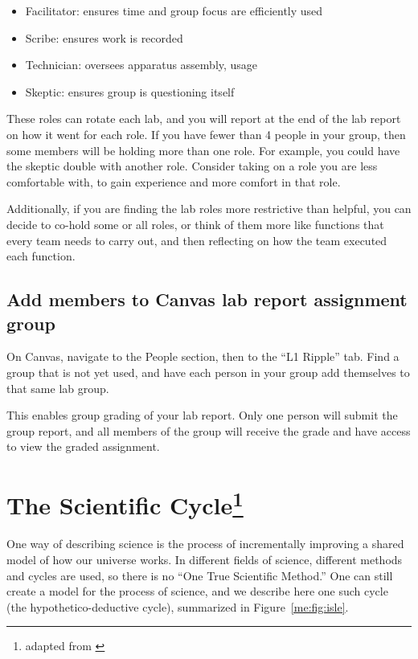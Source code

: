 \begin{itemize}
	\item Facilitator: ensures time and group focus are efficiently used
	\item Scribe: ensures work is recorded
	\item Technician: oversees apparatus assembly, usage
	\item Skeptic: ensures group is questioning itself
\end{itemize}

These roles can rotate each lab, and you will report at the end of the lab report on how it went for each role. If you have fewer than 4 people in your group, then some members will be holding more than one role. For example, you could have the skeptic double with another role. Consider taking on a role you are less comfortable with, to gain experience and more comfort in that role.

Additionally, if you are finding the lab roles more restrictive than helpful, you can decide to co-hold some or all roles, or think of them more like functions that every team needs to carry out, and then reflecting on how the team executed each function.

\subsection{Add members to Canvas lab report assignment group}

\begin{steps}
	\item On Canvas, navigate to the People section, then to the ``L1 Ripple'' tab. Find a group that is not yet used, and have each person in your group add themselves to that same lab group.
\end{steps}

This enables group grading of your lab report. Only one person will submit the group report, and all members of the group will receive the grade and have access to view the graded assignment.

\section{The Scientific Cycle\protect\footnote{adapted from \cite{etkina_college_2014}}}

One way of describing science is the process of incrementally improving a shared model of how our universe works. In different fields of science, different methods and cycles are used, so there is no ``One True Scientific Method.'' One can still create a model for the process of science, and we describe here one such cycle (the hypothetico-deductive cycle), summarized in Figure~\ref{me:fig:isle}.

